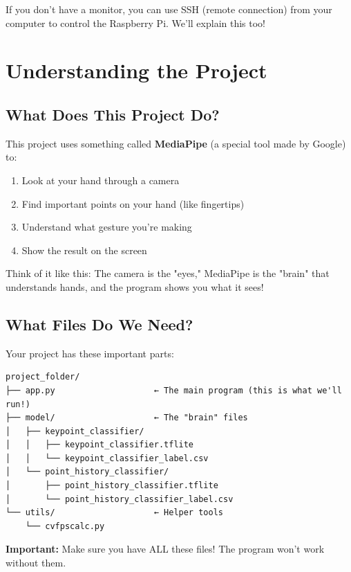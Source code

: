 \documentclass[12pt,a4paper]{article}
\begin{document}
\begin{tipbox}
If you don't have a monitor, you can use SSH (remote connection) from your computer to control the Raspberry Pi. We'll explain this too!
\end{tipbox}

\section{Understanding the Project}

\subsection{What Does This Project Do?}

This project uses something called \textbf{MediaPipe} (a special tool made by Google) to:
\begin{enumerate}
    \item Look at your hand through a camera
    \item Find important points on your hand (like fingertips)
    \item Understand what gesture you're making
    \item Show the result on the screen
\end{enumerate}

Think of it like this: The camera is the "eyes," MediaPipe is the "brain" that understands hands, and the program shows you what it sees!

\subsection{What Files Do We Need?}

Your project has these important parts:

\begin{verbatim}
project_folder/
├── app.py                    ← The main program (this is what we'll run!)
├── model/                    ← The "brain" files
│   ├── keypoint_classifier/
│   │   ├── keypoint_classifier.tflite
│   │   └── keypoint_classifier_label.csv
│   └── point_history_classifier/
│       ├── point_history_classifier.tflite
│       └── point_history_classifier_label.csv
└── utils/                    ← Helper tools
    └── cvfpscalc.py
\end{verbatim}

\begin{warningbox}
\textbf{Important:} Make sure you have ALL these files! The program won't work without them.
\end{warningbox}
\end{document}
